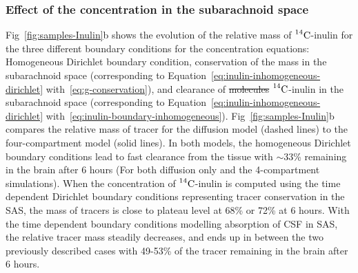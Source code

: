 \documentclass[10pt]{article}
\newcommand{\1}{^{(1)}}
\newcommand{\2}{^{(2)}}
\newcommand{\Cinulin}{$\prescript{14}{}{\text{C}}$-inulin }
\newcommand{\commentout}[1]{}
\providecommand{\DIFdeltex}[1]{{\protect\color{red}\sout{#1}}}                      %
\providecommand{\DIFaddbegin}{} %
\providecommand{\DIFaddend}{} %
\providecommand{\DIFdelbegin}{} %
\providecommand{\DIFdelend}{} %
\providecommand{\DIFdel}[1]{\texorpdfstring{\DIFdeltex{#1}}{}} %
\newcommand{\DIFscaledelfig}{0.5}
\newlength{\DIFdelgraphicswidth} %
\newlength{\DIFdelgraphicsheight} %
\newcommand{\DIFaddincludegraphics}[2][]{{\color{blue}\fbox{\DIFOincludegraphics[#1]{#2}}}} %
\newcommand{\DIFdelincludegraphics}[2][]{%
\sbox{\DIFdelgraphicsbox}{\DIFOincludegraphics[#1]{#2}}%
\settoboxwidth{\DIFdelgraphicswidth}{\DIFdelgraphicsbox} %
\settoboxtotalheight{\DIFdelgraphicsheight}{\DIFdelgraphicsbox} %
\scalebox{\DIFscaledelfig}{%
\parbox[b]{\DIFdelgraphicswidth}{\usebox{\DIFdelgraphicsbox}\\[-\baselineskip] \rule{\DIFdelgraphicswidth}{0em}}\llap{\resizebox{\DIFdelgraphicswidth}{\DIFdelgraphicsheight}{%
\setlength{\unitlength}{\DIFdelgraphicswidth}%
\begin{picture}(1,1)%
\thicklines\linethickness{2pt} %
{\color[rgb]{1,0,0}\put(0,0){\framebox(1,1){}}}%
{\color[rgb]{1,0,0}\put(0,0){\line( 1,1){1}}}%
{\color[rgb]{1,0,0}\put(0,1){\line(1,-1){1}}}%
\end{picture}%
}\hspace*{3pt}}} %
} %
\DeclareRobustCommand{\DIFaddbegin}{\DIFOaddbegin \let\includegraphics\DIFaddincludegraphics} %
\DeclareRobustCommand{\DIFaddend}{\DIFOaddend \let\includegraphics\DIFOincludegraphics} %
\DeclareRobustCommand{\DIFdelbegin}{\DIFOdelbegin \let\includegraphics\DIFdelincludegraphics} %
\DeclareRobustCommand{\DIFdelend}{\DIFOaddend \let\includegraphics\DIFOincludegraphics} %
\begin{document}
\subsubsection{Effect of the concentration in the subarachnoid space}
Fig~\ref{fig:samples-Inulin}b shows the evolution of the relative mass of \Cinulin for the three different boundary conditions for the concentration equations: Homogeneous Dirichlet boundary condition, conservation of the mass in the subarachnoid space (corresponding to Equation~\eqref{eq:inulin-inhomogeneous-dirichlet} with~\eqref{eq:g-conservation}), and clearance of \DIFdelbegin \DIFdel{molecules }\DIFdelend \DIFaddbegin \Cinulin \DIFaddend in the subarachnoid space (corresponding to Equation~\eqref{eq:inulin-inhomogeneous-dirichlet} with~\eqref{eq:inulin-boundary-inhomogeneous}). Fig~\ref{fig:samples-Inulin}b compares the relative mass of tracer for the diffusion model (dashed lines) to the four-compartment model (solid lines). In both models, the homogeneous Dirichlet boundary conditions lead to fast clearance from the tissue with $\sim33$\% remaining in the brain after 6 hours (For both diffusion only and the 4-compartment simulations). When the concentration of \Cinulin is computed using the time dependent Dirichlet boundary conditions representing tracer conservation in the SAS, the mass of tracers is close to plateau level at 68\% or 72\% at 6 hours. With the time dependent boundary conditions modelling absorption of CSF in SAS, the relative tracer mass steadily decreases, and ends up in between the two previously described cases with 49-53\%  of the tracer remaining in the brain after 6 hours. 
\commentout{
 \begin{figure}[htbp]
     \centering
     \begin{subfigure}[t]{0.45\textwidth}
         \captionsetup{width=0.9\textwidth}
         \centering
         \caption{Single diffusion equation}
         \label{fig:diffusion-bcs-Inulin}
     \end{subfigure}
     \hfill
     \begin{subfigure}[t]{0.45\textwidth}
         \captionsetup{width=0.9\textwidth}
         \centering
         \caption{Multi-compartment model.}
         \label{fig:multi-compartment-bcs-Inulin}
     \end{subfigure}
     \caption{Relative \Cinulin mass located in the totality of the brain for the different boundary conditions.}
     \label{fig:bcs-Inulin}
\end{figure}
\begin{figure}
    \centering
    \caption{Relative \Cinulin mass located in the totality of the brain for the different boundary conditions. Solid lines result from the multi-compartment model simulations while dashed lines result from diffusion only in the ECS.}
   \label{fig:bcs-Inulin}
\end{figure}
}
\end{document}
